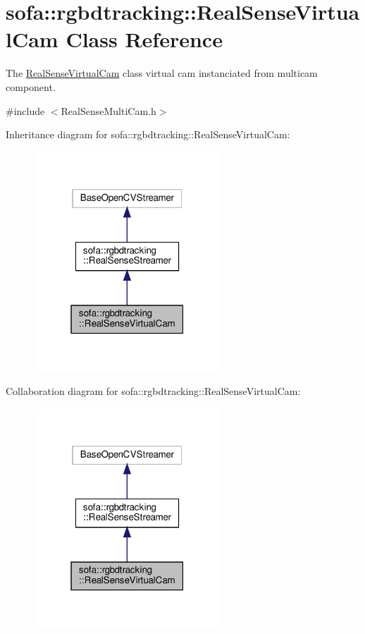 \hypertarget{classsofa_1_1rgbdtracking_1_1_real_sense_virtual_cam}{}\section{sofa\+:\+:rgbdtracking\+:\+:Real\+Sense\+Virtual\+Cam Class Reference}
\label{classsofa_1_1rgbdtracking_1_1_real_sense_virtual_cam}


The \hyperlink{classsofa_1_1rgbdtracking_1_1_real_sense_virtual_cam}{Real\+Sense\+Virtual\+Cam} class virtual cam instanciated from multicam component.  




{\ttfamily \#include $<$Real\+Sense\+Multi\+Cam.\+h$>$}



Inheritance diagram for sofa\+:\+:rgbdtracking\+:\+:Real\+Sense\+Virtual\+Cam\+:\nopagebreak
\begin{figure}[H]
\begin{center}
\leavevmode
\includegraphics[width=199pt]{classsofa_1_1rgbdtracking_1_1_real_sense_virtual_cam__inherit__graph}
\end{center}
\end{figure}


Collaboration diagram for sofa\+:\+:rgbdtracking\+:\+:Real\+Sense\+Virtual\+Cam\+:\nopagebreak
\begin{figure}[H]
\begin{center}
\leavevmode
\includegraphics[width=199pt]{classsofa_1_1rgbdtracking_1_1_real_sense_virtual_cam__coll__graph}
\end{center}
\end{figure}
